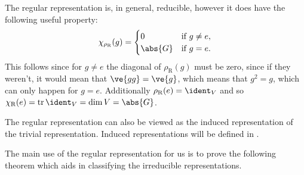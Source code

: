The regular representation is, in general, reducible, however it does have
the following useful property:
\begin{equation}
    \chi_{\rho_{\mathrm{R}}}(g) = 
    \begin{cases}
        0 & \text{if } g \ne e,\\
        \abs{G} & \text{if } g = e.
    \end{cases}
\end{equation}
This follows since for \(g \ne e\) the diagonal of \(\rho_{\mathrm{R}}(g)\)
must be zero, since if they weren't, it would mean that \(\ve{gg} = \ve{g}\),
which means that \(g^2 = g\), which can only happen for \(g = e\).
Additionally \(\rho_{\mathrm{R}}(e) = \ident_{V}\) and so
\(\chi_{\mathrm{R}}(e) = \tr\ident_V = \dim V = \abs{G}\).

The regular representation can also be viewed as the induced representation
of the trivial representation.
Induced representations will be defined in . %

The main use of the regular representation for us is to prove the following
theorem which aids in classifying the irreducible representations.

